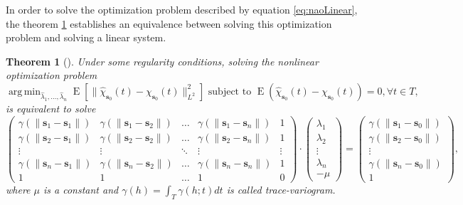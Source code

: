 \documentclass[12pt]{interact}
\theoremstyle{plain}%
\newtheorem{theorem}{Theorem}[section]
\theoremstyle{definition}
\theoremstyle{remark}
\DeclareMathOperator{\espe}{E}
\DeclareMathOperator*{\argmin}{arg\,min}
\begin{document}
In order to solve the optimization problem described by equation \eqref{eq:naoLinear}, the theorem \ref{thm:sistLinear} establishes an equivalence between solving this optimization problem and solving a linear system.
\begin{theorem}[\citet{giraldo2011ordinary}]\label{thm:sistLinear}
	Under some regularity conditions, solving the nonlinear optimization problem
	\begin{equation*}
	\argmin_{\hat{\lambda}_1, \dots, \hat{\lambda}_{n}} \espe \left[ \lVert\hat{\chi}_{\bm{s}_0}(t) - \chi_{\bm{s}_0}(t) \rVert_{L^2}^2\right] \mbox{ subject to }\espe(\hat{\chi}_{\bm{s}_0}(t) - \chi_{\bm{s}_0}(t)) =0, \forall t \in T, 
	\end{equation*}
	is equivalent to solve
	\begin{equation*}
	\begin{pmatrix}
	\gamma(\lVert\bm{s}_1 - \bm{s}_1\rVert) & \gamma(\lVert\bm{s}_1 - \bm{s}_2\rVert) & \dots & \gamma(\lVert\bm{s}_{1} - \bm{s}_n\rVert) & 1\\
	\gamma(\lVert\bm{s}_2 - \bm{s}_1\rVert) & \gamma(\lVert\bm{s}_2 - \bm{s}_2\rVert) & \dots & \gamma(\lVert\bm{s}_{2} - \bm{s}_n\rVert) & 1\\
	\vdots & \vdots & \ddots & \vdots &\vdots\\
	\gamma(\lVert\bm{s}_{n} - \bm{s}_1\rVert) & \gamma(\lVert\bm{s}_{n} - \bm{s}_2\rVert) & \dots & \gamma(\lVert\bm{s}_{n} - \bm{s}_{n}\rVert) & 1\\
	1 & 1 & \dots & 1 & 0
	\end{pmatrix} 
	\cdot 
	\begin{pmatrix}
	\lambda_1\\
	\lambda_2\\
	\vdots\\
	\lambda_{n}\\
	-\mu
	\end{pmatrix} 
	=
	\begin{pmatrix}
	\gamma(\lVert\bm{s}_1 - \bm{s}_0\rVert)\\
	\gamma(\lVert\bm{s}_2 - \bm{s}_0\rVert)\\
	\vdots\\
	\gamma(\lVert\bm{s}_{n}- \bm{s}_0\rVert)\\
	1
	\end{pmatrix},
	\end{equation*}
	where \(\mu\) is a constant and \(\gamma(h) = \int_T \gamma(h;t)dt\) is called trace-variogram.
\end{theorem}
\end{document}
